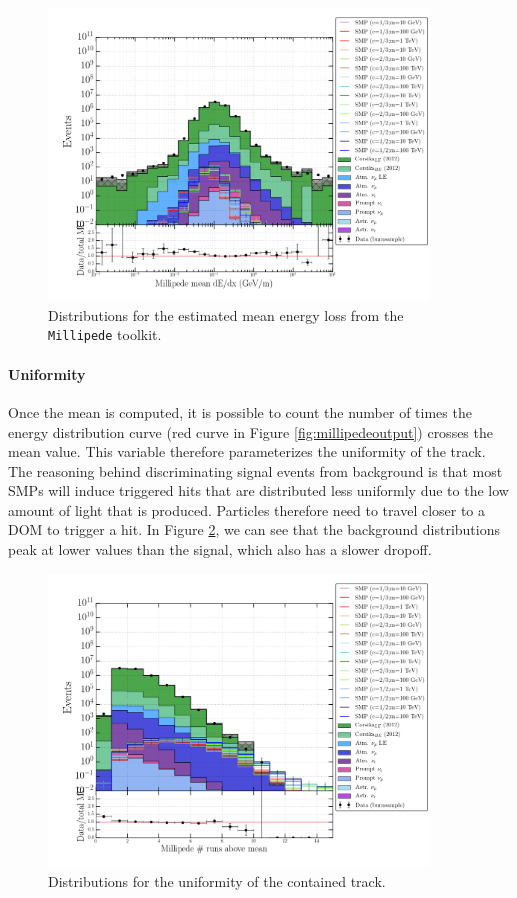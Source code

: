 \begin{figure}
\centering
\includegraphics[width=0.9\textwidth]{chapter8/img/1D_stack_millipede_dedx_mean_nozeroes.png}
\caption{Distributions for the estimated mean energy loss from the \texttt{Millipede} toolkit.}
\label{fig:allmillipedevarmean}
\end{figure}

\paragraph{Uniformity}
Once the mean is computed, it is possible to count the number of times the energy distribution curve (red curve in Figure \ref{fig:millipedeoutput}) crosses the mean value. This variable therefore parameterizes the uniformity of the track. The reasoning behind discriminating signal events from background is that most SMPs will induce triggered hits that are distributed less uniformly due to the low amount of light that is produced. Particles therefore need to travel closer to a DOM to trigger a hit. In Figure \ref{fig:allmillipedevaruniformity}, we can see that the background distributions peak at lower values than the signal, which also has a slower dropoff. 

\begin{figure}
\centering
\includegraphics[width=0.9\textwidth]{chapter8/img/1D_stack_millipede_dedx_runsabovemean.png}
\caption{Distributions for the uniformity of the contained track.}
\label{fig:allmillipedevaruniformity}
\end{figure}

